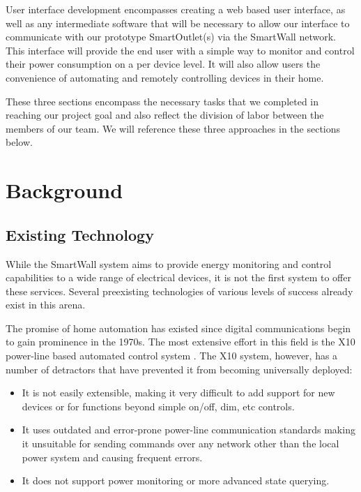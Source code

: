 \documentclass[12pt]{article}
\begin{document}
User interface development encompasses creating a web based user
interface, as well as any intermediate software that will be necessary
to allow our interface to communicate with our prototype
SmartOutlet(s) via the SmartWall network. This interface will provide
the end user with a simple way to monitor and control their power
consumption on a per device level. It will also allow users the
convenience of automating and remotely controlling devices in their home.

These three sections encompass the necessary tasks that we completed
in reaching our project goal and also reflect the division of labor
between the members of our team. We will reference these three
approaches in the sections below.

\section{Background}

\subsection{Existing Technology}

While the SmartWall system aims to provide energy monitoring and
control capabilities to a wide range of electrical devices, it is not the
first system to offer these services. Several preexisting technologies
of various levels of success already exist in this arena.

The promise of home automation has existed since digital communications
begin to gain prominence in the 1970s. The most extensive effort in this
field is the X10 power-line based automated control system
\cite{wiki-X10}. The X10 system, however, has a number of detractors
that have prevented it from becoming universally deployed:
\begin{itemize}
  \setlength{\itemsep}{0pt}
  \setlength{\parskip}{0pt}
  \setlength{\parsep}{0pt}
\item It is not easily extensible, making it very difficult to add
  support for new devices or for functions beyond simple on/off, dim,
  etc controls.
\item It uses outdated and error-prone power-line communication
  standards making it unsuitable for sending commands over any network
  other than the local power system and causing frequent errors.
\item It does not support power monitoring or more advanced state querying.
\end{itemize}  
\end{document}
